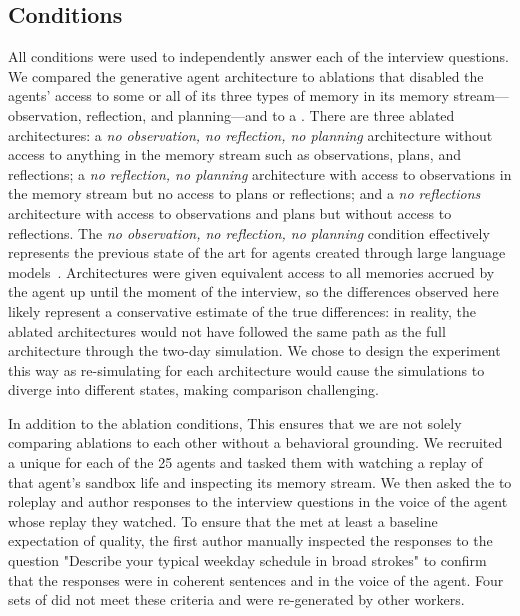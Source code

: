 \subsection{Conditions}
All conditions were used to independently answer each of the interview questions. We compared the generative agent architecture to ablations that disabled the agents' access to some or all of its three types of memory in its memory stream---observation, reflection, and planning---and to a . There are three ablated architectures: a \textit{no observation, no reflection, no planning} architecture without access to anything in the memory stream such as observations, plans, and reflections; a \textit{no reflection, no planning} architecture with access to observations in the memory stream but no access to plans or reflections; and a \textit{no reflections} architecture with access to observations and plans but without access to reflections. The \textit{no observation, no reflection, no planning} condition effectively represents the previous state of the art for agents created through large language models~\cite{9_park2022socialsimulacra,binz2023using,63_horton2023large}. Architectures were given equivalent access to all memories accrued by the agent up until the moment of the interview, so the differences observed here likely represent a conservative estimate of the true differences: in reality, the ablated architectures would not have followed the same path as the full architecture through the two-day simulation. We chose to design the experiment this way as re-simulating for each architecture would cause the simulations to diverge into different states, making comparison challenging.

In addition to the ablation conditions,  This ensures that we are not solely comparing ablations to each other without a behavioral grounding. We recruited a unique  for each of the 25 agents and tasked them with watching a replay of that agent's sandbox life and inspecting its memory stream. We then asked the  to roleplay and author responses to the interview questions in the voice of the agent whose replay they watched. To ensure that the  met at least a baseline expectation of quality, the first author manually inspected the  responses to the question "Describe your typical weekday schedule in broad strokes" to confirm that the responses were in coherent sentences and in the voice of the agent. Four sets of  did not meet these criteria and were re-generated by other workers.

